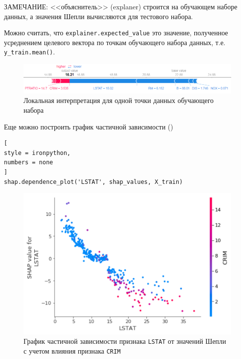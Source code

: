 \documentclass[%
	11pt,
	a4paper,
	utf8,
		]{article}
\begin{document}
ЗАМЕЧАНИЕ: <<объяснитель>> (explaner) строится на обучающем наборе данных, а значения Шепли вычисляются для тестового набора.

Можно считать, что \texttt{explainer.expected\_value} это значение, полученное усреднением целевого вектора по точкам обучающего набора данных, т.е. \texttt{y\_train.mean()}.

\begin{figure}[h]
	\centering
	\includegraphics[scale=0.80]{figures/shap_force_plt_train.png}
	\caption{ Локальная интерпретация для одной точки данных обучающего набора }\label{fig:shap_force_plt_train}
\end{figure}

Еще можно построить график частичной зависимости ()

\begin{lstlisting}[
style = ironpython,
numbers = none
]
shap.dependence_plot('LSTAT', shap_values, X_train)
\end{lstlisting}

\begin{figure}[h]
	\centering
	\includegraphics[scale=0.85]{figures/shap_dependence_plt_train.png}
	\caption{ График частичной зависимости признака \texttt{LSTAT} от значений Шепли\\с учетом влияния признака \texttt{CRIM} }\label{fig:shap_dependence_plt_train}
\end{figure}
\end{document}
